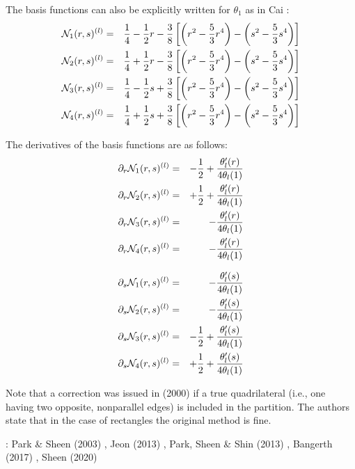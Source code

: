 The basis functions can also be explicitly written for $\theta_1$ as in Cai \etal \cite{cady99}:
\begin{eqnarray}
{\mathcal{N}}_1(r,s)^{(l)} 
&=& \frac{1}{4} - \frac{1}{2} r - \frac38 \left[\left( r^2-\frac53r^4 \right) - \left(s^2-\frac53s^4 \right) \right] \nonumber\\
{\mathcal{N}}_2(r,s)^{(l)} 
&=& \frac{1}{4} + \frac{1}{2} r - \frac38 \left[\left( r^2-\frac53r^4 \right) - \left(s^2-\frac53s^4 \right) \right] \nonumber\\
{\mathcal{N}}_3(r,s)^{(l)} 
&=& \frac{1}{4} - \frac{1}{2} s + \frac38 \left[\left( r^2-\frac53r^4 \right) - \left(s^2-\frac53s^4 \right) \right] \nonumber\\
{\mathcal{N}}_4(r,s)^{(l)} 
&=& \frac{1}{4} + \frac{1}{2} s + \frac38 \left[\left( r^2-\frac53r^4 \right) - \left(s^2-\frac53s^4 \right) \right] 
\end{eqnarray}

The derivatives of the basis functions are as follows:
\begin{eqnarray}
\partial_r {\mathcal{N}}_1(r,s)^{(l)} &=&  - \frac{1}{2}  + \frac{\theta_l'(r)}{4 \theta_l(1)}  \nonumber\\
\partial_r {\mathcal{N}}_2(r,s)^{(l)} &=&  + \frac{1}{2}  + \frac{\theta_l'(r)}{4 \theta_l(1)}  \nonumber\\
\partial_r {\mathcal{N}}_3(r,s)^{(l)} &=&  - \frac{\theta_l'(r)}{4 \theta_l(1)}  \nonumber\\
\partial_r {\mathcal{N}}_4(r,s)^{(l)} &=&  - \frac{\theta_l'(r)}{4 \theta_l(1)}  
\end{eqnarray}

\begin{eqnarray}
\partial_s {\mathcal{N}}_1(r,s)^{(l)} &=&   -\frac{\theta_l'(s)}{4 \theta_l(1)}  \nonumber\\
\partial_s {\mathcal{N}}_2(r,s)^{(l)} &=&   -\frac{\theta_l'(s)}{4 \theta_l(1)}  \nonumber\\
\partial_s {\mathcal{N}}_3(r,s)^{(l)} &=&   - \frac{1}{2} + \frac{\theta_l'(s)}{4 \theta_l(1)}  \nonumber\\
\partial_s {\mathcal{N}}_4(r,s)^{(l)} &=&   + \frac{1}{2} + \frac{\theta_l'(s)}{4 \theta_l(1)}  
\end{eqnarray}



Note that a correction was issued in \textcite{cads00} (2000) if a 
true quadrilateral (i.e., one having two opposite, nonparallel edges) is included in
the partition. The authors state that in the case of rectangles the original method is fine.

\Literature: 
Park \& Sheen (2003) \cite{pash03},
Jeon \etal (2013) \cite{jens13},
Park, Sheen \& Shin (2013) \cite{pass13},
Bangerth \etal (2017) \cite{baks17},
Sheen (2020) \cite{shee20}
